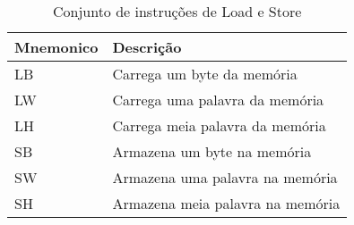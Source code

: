 \documentclass{report}
\begin{document}
  \FloatBarrier
    \begin{table}[H]
      \begin{center}
        \begin{tabular}[pos]{|m{3cm} | m{8cm}|} 
          \hline
          \cellcolor[gray]{0.9}\textbf{Mnemonico} & \cellcolor[gray]{0.9}\textbf{Descrição} \\ \hline
              LB  &  Carrega um byte da memória \\ \hline
              LW  &  Carrega uma palavra da memória \\ \hline
              LH  &  Carrega meia palavra da memória \\ \hline
              SB  &  Armazena um byte na memória \\ \hline
              SW  &  Armazena uma palavra na memória \\ \hline
              SH  &  Armazena meia palavra na memória \\ \hline
        \end{tabular}
        \caption{Conjunto de instruções de Load e Store}
		\label{table:conjLoadStore}
      \end{center}
    \end{table}
    
\end{document}
